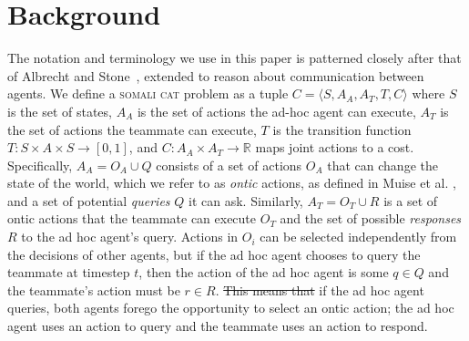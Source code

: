 \documentclass[letterpaper]{article}
\providecommand{\DIFaddtex}[1]{{\protect\color{blue}\uwave{#1}}} %
\providecommand{\DIFdeltex}[1]{{\protect\color{red}\sout{#1}}}                      %
\providecommand{\DIFaddbegin}{} %
\providecommand{\DIFaddend}{} %
\providecommand{\DIFdelbegin}{} %
\providecommand{\DIFdelend}{} %
\providecommand{\DIFadd}[1]{\texorpdfstring{\DIFaddtex{#1}}{#1}} %
\providecommand{\DIFdel}[1]{\texorpdfstring{\DIFdeltex{#1}}{}} %
\newcommand{\DIFscaledelfig}{0.5}
\newlength{\DIFdelgraphicswidth} %
\newlength{\DIFdelgraphicsheight} %
\newcommand{\DIFaddincludegraphics}[2][]{{\color{blue}\fbox{\DIFOincludegraphics[#1]{#2}}}} %
\newcommand{\DIFdelincludegraphics}[2][]{%
\sbox{\DIFdelgraphicsbox}{\DIFOincludegraphics[#1]{#2}}%
\settoboxwidth{\DIFdelgraphicswidth}{\DIFdelgraphicsbox} %
\settoboxtotalheight{\DIFdelgraphicsheight}{\DIFdelgraphicsbox} %
\scalebox{\DIFscaledelfig}{%
\parbox[b]{\DIFdelgraphicswidth}{\usebox{\DIFdelgraphicsbox}\\[-\baselineskip] \rule{\DIFdelgraphicswidth}{0em}}\llap{\resizebox{\DIFdelgraphicswidth}{\DIFdelgraphicsheight}{%
\setlength{\unitlength}{\DIFdelgraphicswidth}%
\begin{picture}(1,1)%
\thicklines\linethickness{2pt} %
{\color[rgb]{1,0,0}\put(0,0){\framebox(1,1){}}}%
{\color[rgb]{1,0,0}\put(0,0){\line( 1,1){1}}}%
{\color[rgb]{1,0,0}\put(0,1){\line(1,-1){1}}}%
\end{picture}%
}\hspace*{3pt}}} %
} %
\DeclareRobustCommand{\DIFaddbegin}{\DIFOaddbegin \let\includegraphics\DIFaddincludegraphics} %
\DeclareRobustCommand{\DIFaddend}{\DIFOaddend \let\includegraphics\DIFOincludegraphics} %
\DeclareRobustCommand{\DIFdelbegin}{\DIFOdelbegin \let\includegraphics\DIFdelincludegraphics} %
\DeclareRobustCommand{\DIFdelend}{\DIFOaddend \let\includegraphics\DIFOincludegraphics} %
\begin{document}

\section{Background}
The notation and terminology we use in this paper is patterned closely after that of Albrecht and Stone~, extended to reason about communication between agents. We define a \textsc{somali cat} problem as a tuple $C=\langle S, A_A, A_T, T, C \rangle$ where $S$ is the set of states, $A_A$ is the set of actions the ad-hoc agent can execute, $A_T$ is the set of actions the teammate can execute, $T$ is the transition function $T:S\times A\times S \to [0,1]$, and $C: A_A \times A_T \rightarrow \mathbb{R}$ maps joint actions to a cost. Specifically, $A_A = O_A \cup Q$ consists of a set of actions $O_A$ that can change the state of the world, which we refer to as \emph{ontic} actions, as defined in Muise et al. , and a set of potential \emph{queries} $Q$ it can ask. Similarly, $A_T = O_T \cup R$ is a set of ontic actions that the teammate can execute $O_T$ and the set of possible \emph{responses} $R$ to the ad hoc agent's query. 
 Actions in $O_i$ can be selected independently from the decisions of other agents, but if the ad hoc agent chooses to query the teammate at timestep $t$, then the action of the ad hoc agent is some $q \in Q$ and the teammate's action must be $r \in R$. \DIFdelbegin \DIFdel{This means that }\DIFdelend \DIFaddbegin \DIFadd{In this case, }\DIFaddend if the ad hoc agent queries, both agents forego the opportunity to select an ontic action; the ad hoc agent uses an action to query and the teammate uses an action to respond.
\DIFdelbegin %
\end{document}
